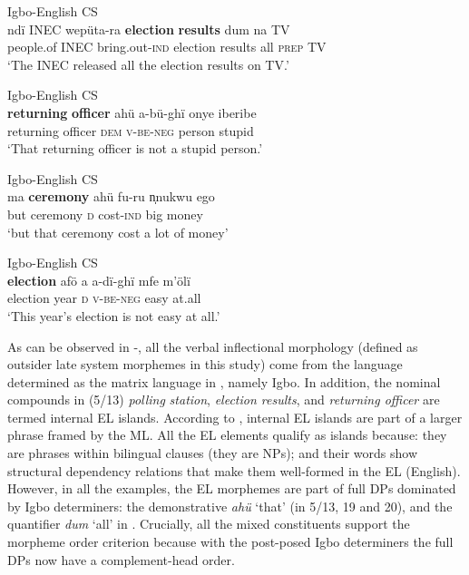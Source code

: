 \documentclass[output=paper]{langsci/langscibook}
\begin{document}
\ea\label{ex:ihemere:18}
{Igbo-English CS}\\
\gll ndï    INEC  wepüta-ra  \textbf{election} \textbf{results}   dum  na  TV\\
     people.of  INEC  bring.out-\textsc{ind}   election results  all  \textsc{prep}  TV\\
\glt ‘The INEC released all the election results on TV.’    
\z

\ea\label{ex:ihemere:19}
{Igbo-English CS}\\
\gll \textbf{returning} \textbf{officer}  ahü       a-bü-ghï        onye    iberibe\\
     returning officer     \textsc{dem}  \textsc{v-be-neg}  person  stupid\\
\glt ‘That returning officer is not a stupid person.’
\z

\ea\label{ex:ihemere:20}
{Igbo-English CS}\\
\gll ma  \textbf{ceremony}   ahü  fu-ru      n̩nukwu   ego\\
     but ceremony  \textsc{d}  cost-\textsc{ind}  big    money\\
\glt ‘but that ceremony cost a lot of money’
\z

\ea\label{ex:ihemere:21}
{Igbo-English CS}\\
\gll \textbf{election}  afö  a  a-dï-ghï  mfe  m’ölï\\
     election    year  \textsc{d}  \textsc{v-be-neg}  easy  at.all\\
\glt ‘This year’s election is not easy at all.’
\z

As can be observed in -, all the verbal inflectional morphology (defined as outsider late system morphemes in this study) come from the language determined as the matrix language in , namely Igbo. In addition, the nominal compounds in (5/13) \textit{polling}\textbf{\textit{}} \textit{station},  \textit{election results}, and  \textit{returning officer} are termed internal EL islands. According to \citet[265]{MyersScotton2006}, internal EL islands are part of a larger phrase framed by the ML. All the EL elements qualify as islands because: they are phrases within bilingual clauses (they are NPs); and their words show structural dependency relations that make them well-formed in the EL (English). However, in all the examples, the EL morphemes are part of full DPs dominated by Igbo determiners: the demonstrative \textit{ahü} ‘that’ (in 5/13, 19 and 20), and the quantifier \textit{dum} ‘all’ in . Crucially, all the mixed constituents support the morpheme order criterion because with the post-posed Igbo determiners the full DPs now have a complement-head order. 
\end{document}
